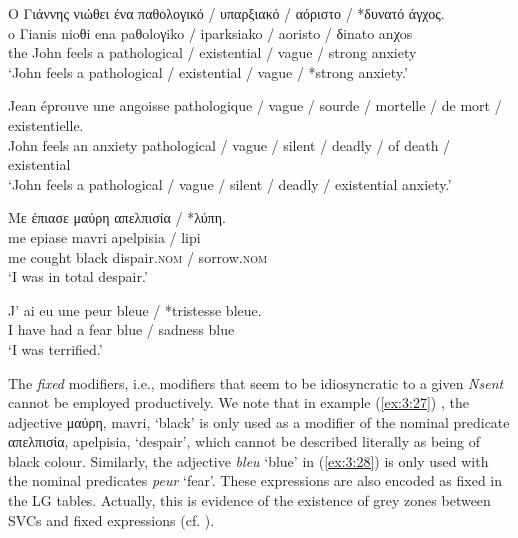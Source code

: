\documentclass[output=paper]{langsci/langscibook}
\begin{document}
\begin{exe}
\ex \label{ex:3:25}
\glll O Γιάννης νιώθει ένα παθολογικό / υπαρξιακό / αόριστο / *δυνατό άγχος.\\
o Γianis nioθi ena paθoloγiko / iparksiako / aoristo / δinato anχos\\
the John feels a pathological / existential / vague / strong anxiety\\
\glt ‘John feels a pathological / existential / vague / *strong anxiety.’
\end{exe}

\begin{exe}
\ex \label{ex:3:26}
\gll Jean éprouve une angoisse pathologique / vague / sourde / mortelle / de mort / existentielle. \\
John feels an anxiety pathological / vague / silent / deadly / of death / existential\\
\glt ‘John feels a pathological / vague / silent / deadly / existential anxiety.’
\end{exe}

\begin{exe}
\ex \label{ex:3:27}
\glll Mε έπιασε μαύρη απελπισία / *λύπη. \\
 me epiase mavri apelpisia / lipi\\
me cought black dispair.\textsc{nom} / sorrow.\textsc{nom}\\
\glt %
‘I was in total despair.’
\end{exe}

\begin{exe}
\ex \label{ex:3:28}
\gll  J' ai eu une peur bleue / *tristesse bleue. \\
I have had a fear blue / sadness blue\\
\glt %
‘I was terrified.’
\end{exe}

The\textit{ fixed} modifiers, i.e., modifiers that seem to be
idiosyncratic to a given \textit{Nsent} cannot be employed
productively. We note that in example (\ref{ex:3:27}) , the adjective
μαύρη, mavri, ‘black’ is only used as a modifier of the nominal
predicate απελπισία, apelpisia, ‘despair’, which cannot be described
literally as being of black colour. Similarly, the  adjective
\textit{bleu }‘blue’ in (\ref{ex:3:28}) is only used with the nominal predicates
\textit{peur }‘fear’. These expressions are also encoded as fixed in 
the LG tables. Actually, this is evidence of the existence of grey
zones between SVCs and fixed expressions (cf. ).
\end{document}

